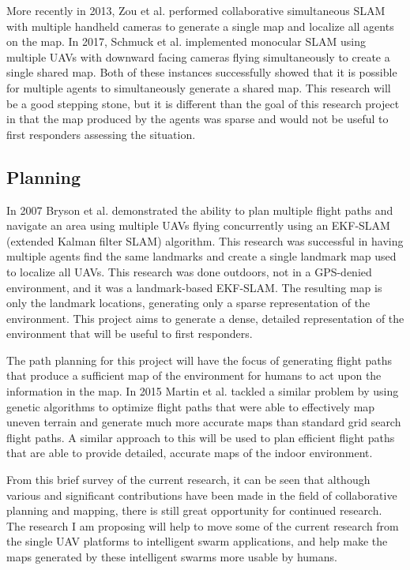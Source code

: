 \documentclass[12pt, letterpaper]{article}
\begin{document}
More recently in 2013, Zou et al. \cite{Zou2013} performed collaborative simultaneous SLAM with multiple handheld cameras to generate a single map and localize all agents on the map. In 2017, Schmuck et al. \cite{Schmuck2017} implemented monocular SLAM using multiple UAVs with downward facing cameras flying simultaneously to create a single shared map. Both of these instances successfully showed that it is possible for multiple agents to simultaneously generate a shared map. This research will be a good stepping stone, but it is different than the goal of this research project in that the map produced by the agents was sparse and would not be useful to first responders assessing the situation. 

\subsection{Planning}
In 2007 Bryson et al. \cite{Bryson2007} demonstrated the ability to plan multiple flight paths and navigate an area using multiple UAVs flying concurrently using an EKF-SLAM (extended Kalman filter SLAM) algorithm. This research was successful in having multiple agents find the same landmarks and create a single landmark map used to localize all UAVs. This research was done outdoors, not in a GPS-denied environment, and it was a landmark-based EKF-SLAM. The resulting map is only the landmark locations, generating only a sparse representation of the environment. This project aims to generate a dense, detailed representation of the environment that will be useful to first responders.

The path planning for this project will have the focus of generating flight paths that produce a sufficient map of the environment for humans to act upon the information in the map. In 2015 Martin et al. \cite{Martin2015} tackled a similar problem by using genetic algorithms to optimize flight paths that were able to effectively map uneven terrain and generate much more accurate maps than standard grid search flight paths. A similar approach to this will be used to plan efficient flight paths that are able to provide detailed, accurate maps of the indoor environment. 

From this brief survey of the current research, it can be seen that although various and significant contributions have been made in the field of collaborative planning and mapping, there is still great opportunity for continued research.  The research I am proposing will help to move some of the current research from the single UAV platforms to intelligent swarm applications, and help make the maps generated by these intelligent swarms more usable by humans.
\end{document}
